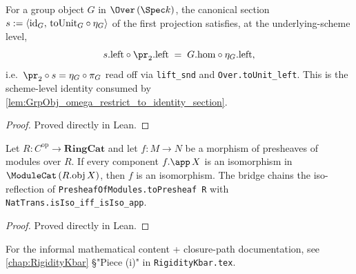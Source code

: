 \begin{lemma}
  \label{lem:section_snd_eq_identity_struct}
  For a group object \(G\) in \(\Over\,(\Spec k)\), the canonical section
  \(s := \langle \mathrm{id}_{G},\, \mathrm{toUnit}_{G} \circ \eta_{G} \rangle\) of
  the first projection satisfies, at the underlying-scheme level,
  \[
    s.\mathrm{left} \circ \pr_{2}.\mathrm{left}
      \;=\; G.\mathrm{hom} \circ \eta_{G}.\mathrm{left},
  \]
  i.e.\ \(\pr_{2} \circ s = \eta_{G} \circ \pi_{G}\) read off via
  \texttt{lift\_snd} and \texttt{Over.toUnit\_left}. This is the
  scheme-level identity consumed by
  \cref{lem:GrpObj_omega_restrict_to_identity_section}.
\end{lemma}
\begin{proof}

\leanok
  Proved directly in Lean.
\end{proof}

\begin{lemma}
  \label{lem:isIso_of_app_iso_module}
  Let \(R \colon C^{\mathrm{op}} \to \mathbf{RingCat}\) and let
  \(f \colon M \to N\) be a morphism of presheaves of modules over \(R\).
  If every component \(f.\app\,X\) is an isomorphism in
  \(\ModuleCat\,(R.\obj\,X)\), then \(f\) is an isomorphism. The bridge
  chains the iso-reflection of \texttt{PresheafOfModules.toPresheaf\,R}
  with \texttt{NatTrans.isIso\_iff\_isIso\_app}.
\end{lemma}
\begin{proof}

\leanok
  Proved directly in Lean.
\end{proof}

For the informal mathematical content + closure-path documentation, see
\cref{chap:RigidityKbar} \S "Piece (i)" in \texttt{RigidityKbar.tex}.
